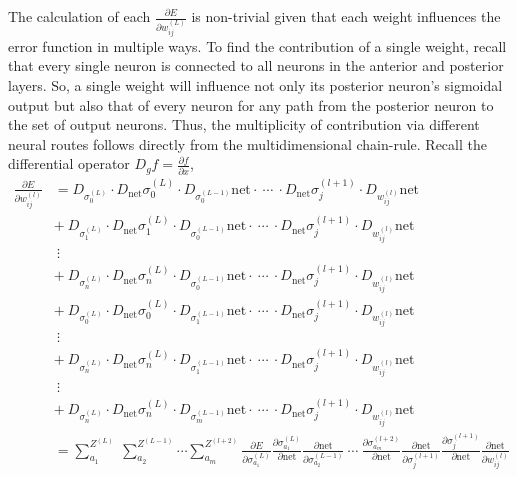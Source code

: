 The calculation of each \(\frac{\partial E}{\partial w_{ij}^{(L)}}\) is non-trivial given that each weight influences the error function in multiple ways.  To find the contribution of a single weight, recall that every single neuron is connected to all neurons in the anterior and posterior layers. So, a single weight will influence not only its posterior neuron’s sigmoidal output but also that of every neuron for any path from the posterior neuron to the set of output neurons. Thus, the multiplicity of contribution via different neural routes follows directly from the multidimensional chain-rule. Recall the differential operator \(D_g f=\frac{\partial f}{\partial x}\),
\begin{equation}
    \begin{aligned}
    \frac{\partial E}{\partial w_{ij}^{(l)}} &= D_{\sigma_0^{(L)}}\cdot D_{\mathrm{net}} \sigma_0^{(L)} \cdot D_{\sigma_0^{(L-1)}}\mathrm{net}\cdot \  \cdots \  \cdot  D_{\mathrm{net}} \sigma_j^{(l+1)} \cdot D_{w_{ij}^{(l)}}\mathrm{net} \\
    &+\  D_{\sigma_1^{(L)}}\cdot D_{\mathrm{net}} \sigma_1^{(L)} \cdot D_{\sigma_0^{(L-1)}}\mathrm{net}\cdot\  \cdots \  \cdot  D_{\mathrm{net}} \sigma_j^{(l+1)} \cdot D_{w_{ij}^{(l)}}\mathrm{net} \\
    &\ \vdots\\
    &+\  D_{\sigma_n^{(L)}}\cdot D_{\mathrm{net}} \sigma_n^{(L)} \cdot D_{\sigma_0^{(L-1)}}\mathrm{net}\cdot \  \cdots \  \cdot  D_{\mathrm{net}} \sigma_j^{(l+1)} \cdot D_{w_{ij}^{(l)}}\mathrm{net} \\
        &+\  D_{\sigma_0^{(L)}}\cdot D_{\mathrm{net}} \sigma_0^{(L)} \cdot D_{\sigma_1^{(L-1)}}\mathrm{net}\cdot \  \cdots \  \cdot  D_{\mathrm{net}} \sigma_j^{(l+1)} \cdot D_{w_{ij}^{(l)}}\mathrm{net} \\
            &\ \vdots\\
        &+\  D_{\sigma_n^{(L)}}\cdot D_{\mathrm{net}} \sigma_n^{(L)} \cdot D_{\sigma_1^{(L-1)}}\mathrm{net}\cdot \ \cdots \  \cdot  D_{\mathrm{net}} \sigma_j^{(l+1)} \cdot D_{w_{ij}^{(l)}}\mathrm{net} \\
                &\ \vdots \\
                        &+\  D_{\sigma_n^{(L)}}\cdot D_{\mathrm{net}} \sigma_n^{(L)} \cdot D_{\sigma_m^{(L-1)}}\mathrm{net}\cdot \ \cdots \ \cdot  D_{\mathrm{net}} \sigma_j^{(l+1)} \cdot D_{w_{ij}^{(l)}}\mathrm{net} \\
                        &= \sum_{a_1}^{Z^{(L)}}\ \sum_{a_2}^{Z^{(L-1)}} \cdots \sum_{a_m}^{Z^{(l+2)}} \frac{\partial E}{\partial \sigma_{a_1}^{(L)}}\frac{\partial \sigma_{a_1}^{(L)}}{\partial \mathrm{net}} \frac{\partial \mathrm{net}}{\partial \sigma_{a_2}^{(L-1)}} \ \cdots\ \frac{\partial \sigma_{a_m}^{(l+2)}}{\partial \mathrm{net}}\frac{\partial \mathrm{net}}{\partial \sigma_{j}^{(l+1)}}  \frac{\partial \sigma_{j}^{(l+1)}}{\partial \mathrm{net}} \frac{\partial \mathrm{net}}{\partial w_{ij}^{(l)}}

\end{aligned}
\end{equation}
